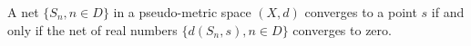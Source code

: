 A net $\{S_n, n \in D\}$ in a pseudo-metric space $(X,d)$ converges to a point $s$ if and only if the net of real numbers $\{d(S_n, s), n \in D\}$ converges to zero.
